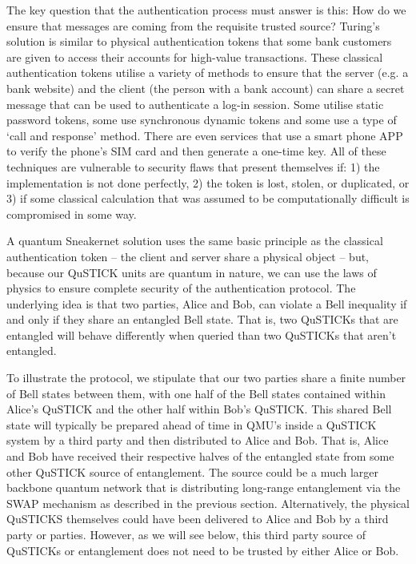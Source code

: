 \documentclass[twocolumn, aps, rmp, amsmath, amssymb, nofootinbib, superscriptaddress, longbibliography, floatfix, table-of-contents, eqsecnum]{revtex4-2}
\begin{document}
The key question that the authentication process must answer is this: How do we ensure that messages are coming from the requisite trusted source? Turing's solution is similar to physical authentication tokens that some bank customers are given to access their accounts for high-value transactions. These classical authentication tokens utilise a variety of methods to ensure that the server (e.g. a bank website) and the client (the person with a bank account) can share a secret message that can be used to authenticate a log-in session. Some utilise static password tokens, some use synchronous dynamic tokens and some use a type of `call and response' method. There are even services that use a smart phone APP to verify the phone's SIM card and then generate a one-time key. All of these techniques are vulnerable to security flaws that present themselves if: 1) the implementation is not done perfectly, 2) the token is lost, stolen, or duplicated, or 3) if some classical calculation that was assumed to be computationally difficult is compromised in some way. 

A quantum Sneakernet solution uses the same basic principle as the classical authentication token -- the client and server share a physical object -- but, because our QuSTICK units are quantum in nature, we can use the laws of physics to ensure complete security of the authentication protocol. The underlying idea is that two parties, Alice and Bob, can violate a Bell inequality if and only if they share an entangled Bell state. That is, two QuSTICKs that are entangled will behave differently when queried than two QuSTICKs that aren't entangled.

To illustrate the protocol, we stipulate that our two parties share a finite number of Bell states between them, with one half of the Bell states contained within Alice's QuSTICK and the other half within Bob's QuSTICK. This shared Bell state will typically be prepared ahead of time in QMU's inside a QuSTICK system by a third party and then distributed to Alice and Bob. That is, Alice and Bob have received their respective halves of the entangled state from some other QuSTICK source of entanglement. The source could be a much larger backbone quantum network that is distributing long-range entanglement via the SWAP mechanism as described in the previous section. Alternatively, the physical QuSTICKS themselves could have been delivered to Alice and Bob by a third party or parties. However, as we will see below, this third party source of QuSTICKs or entanglement does not need to be trusted by either Alice or Bob.
\end{document}
